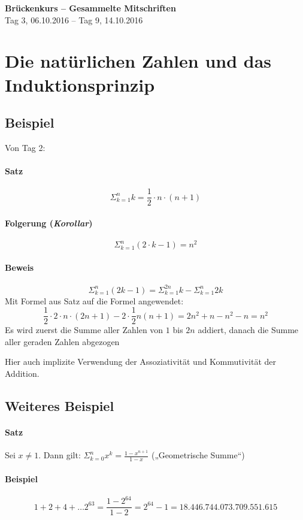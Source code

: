 \documentclass[14pt,a4paper]{article}
\begin{document}
	\begin{center}
		\Huge{\textbf{Brückenkurs – Gesammelte Mitschriften}}\\
		\normalsize{Tag 3, 06.10.2016 – Tag 9, 14.10.2016}
	\end{center}
	\par

	\section{Die natürlichen Zahlen und das Induktionsprinzip}
	\subsection{Beispiel}
		Von Tag 2:
			\paragraph{Satz}
				$$ \Sigma_{k=1}^{n} k = \frac{1}{2} \cdot n \cdot (n + 1) $$
			\paragraph{Folgerung (\textit{Korollar})}
				$$ \Sigma_{k=1}^{n} ( 2 \cdot k -1 ) = n^2 $$
			\paragraph{Beweis}
				$$ \Sigma_{k=1}^{n} (2k-1) = \Sigma_{k=1}^{2n} k - \Sigma_{k=1}^{n} 2k $$
				Mit Formel aus Satz auf die Formel angewendet:
				$$ \frac{1}{2} \cdot 2 \cdot n \cdot (2n+1) -2 \cdot \frac{1}{2} n(n+1) = 2n^2 + n - n^2 -n = n^2 $$
				Es wird zuerst die Summe aller Zahlen von $1$ bis $2n$ addiert, danach die Summe aller geraden Zahlen abgezogen

				Hier auch implizite Verwendung der Assoziativität und Kommutivität der Addition.

	\subsection{Weiteres Beispiel}
		\paragraph{Satz} Sei $ x \neq 1 $. Dann gilt: $\Sigma_{k=0}^{n} x^k = \frac{1-x^{n+1}}{1-x} $ („Geometrische Summe“)
		\paragraph{Beispiel}
			$$ 1 + 2 + 4 + \dots 2^{63} = \frac{1-2^{64}}{1-2} = 2^{64} - 1 = 18.446.744.073.709.551.615 $$
\end{document}

